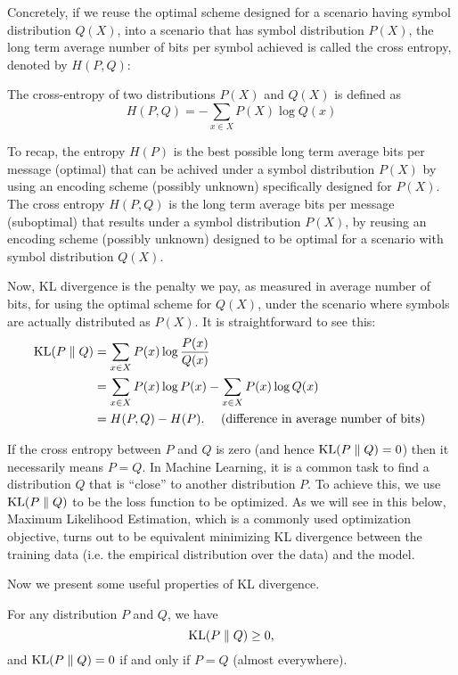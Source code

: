 \documentclass[a4paper]{article}
\begin{document}
Concretely, if we reuse the optimal scheme designed for a
scenario having symbol distribution $Q(X)$, into a scenario
that has symbol distribution $P(X)$, the long term average
number of bits per symbol achieved is called the cross entropy,
denoted by $H(P,Q)$:

\begin{defi}
  The cross-entropy of two distributions $P(X)$
  and $Q(X)$ is defined as
  \[
  H(P, Q) = - \sum_{x \in X} P(X) \log Q(x)
  \]
\end{defi}

To recap, the entropy $H(P)$ is the best possible long term
average bits per message (optimal) that can be achived under
a symbol distribution $P(X)$ by using an encoding scheme
(possibly unknown) specifically designed for $P(X)$.
The cross entropy $H(P,Q)$ is the long term average bits
per message (suboptimal) that results under a symbol
distribution $P(X)$, by reusing an encoding scheme
(possibly unknown) designed to be optimal for a scenario
with symbol distribution $Q(X)$.

Now, KL divergence is the penalty we pay, as measured in
average number of bits, for using the optimal scheme for
$Q(X)$, under the scenario where symbols are actually
distributed as $P(X)$. It is straightforward to see this:
\[
\begin{aligned}
  \operatorname{KL}(P \; \Vert \; Q)
  &= \sum_{x \in X} P(x) \log \frac{P(x)}{Q(x)} \\
  &= \sum_{x \in X} P(x) \log P(x) - \sum_{x \in X}
  P(x) \log Q(x) \\
  &= H(P, Q) - H(P).
  \quad \text{ (difference in average number of bits) }
\end{aligned}
\]

If the cross entropy between $P$ and $Q$ is zero
(and hence $\operatorname{KL}(P \; \Vert \; Q) = 0$) then it necessarily
means $P = Q$. In Machine Learning, it is a common
task to find a distribution $Q$ that is ``close'' to
another distribution $P$. To achieve this, we use
$\operatorname{KL}(P \; \Vert \; Q)$ to be the loss function to be optimized.
As we will see in this below, Maximum Likelihood
Estimation, which is a commonly used optimization objective,
turns out to be equivalent minimizing KL divergence between
the training data (i.e. the empirical distribution over the
data) and the model.

Now we present some useful properties of KL divergence.

\begin{thm}
  For any distribution $P$ and $Q$, we have
  \[
  \operatorname{KL}(P \; \Vert \; Q) \geq 0,
  \]
  and $\operatorname{KL}(P \; \Vert \; Q) = 0$ if and only if $P = Q$ (almost
  everywhere).
\end{thm}
\end{document}
